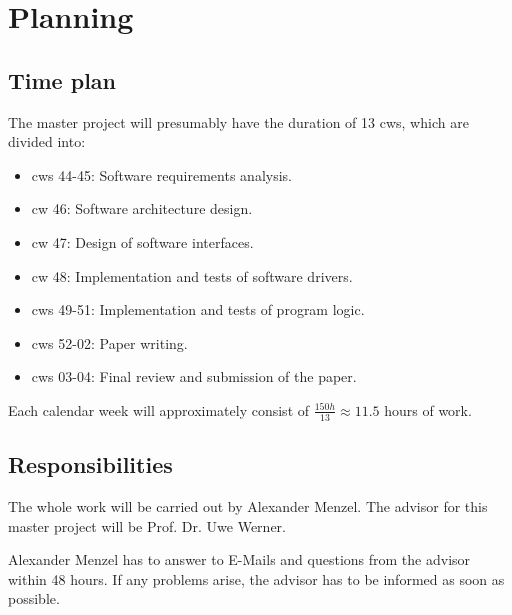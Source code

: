 %
%

\chapter{Planning}
\label{chap:Planning}

\section{Time plan}
\label{sec:Time plan}
%
The master project will presumably have the duration of 13 \acp{cw}, which are divided into:

\begin{itemize}
    \item \acsp{cw} 44-45: Software requirements analysis.
    \item \acs{cw} 46: Software architecture design.
    \item \acs{cw} 47: Design of software interfaces.
    \item \acs{cw} 48: Implementation and tests of software drivers.
    \item \acsp{cw} 49-51: Implementation and tests of program logic.
    \item \acsp{cw} 52-02: Paper writing.
    \item \acsp{cw} 03-04: Final review and submission of the paper.
\end{itemize}

Each calendar week will approximately consist of $\frac{150\unit{h}}{13} \approx 11.5$ hours of work.

\section{Responsibilities}
\label{sec:Responsibilities}

The whole work will be carried out by Alexander Menzel. The advisor for this master project will be Prof. Dr. Uwe Werner.

Alexander Menzel has to answer to E-Mails and questions from the advisor within 48 hours. If any problems arise, the advisor has to be informed as soon as possible.